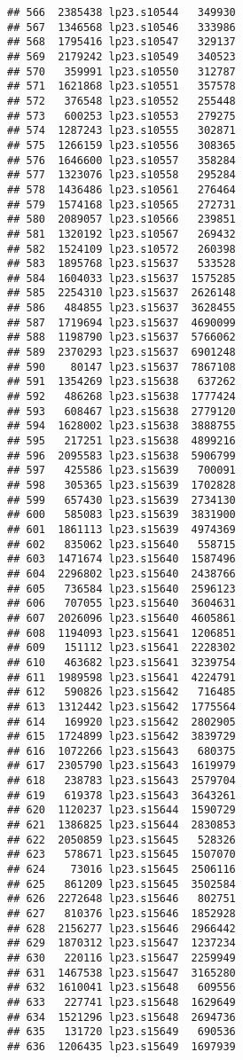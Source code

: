 \documentclass[
]{article}
\begin{document}
\begin{verbatim}
## 566  2385438 lp23.s10544   349930
## 567  1346568 lp23.s10546   333986
## 568  1795416 lp23.s10547   329137
## 569  2179242 lp23.s10549   340523
## 570   359991 lp23.s10550   312787
## 571  1621868 lp23.s10551   357578
## 572   376548 lp23.s10552   255448
## 573   600253 lp23.s10553   279275
## 574  1287243 lp23.s10555   302871
## 575  1266159 lp23.s10556   308365
## 576  1646600 lp23.s10557   358284
## 577  1323076 lp23.s10558   295284
## 578  1436486 lp23.s10561   276464
## 579  1574168 lp23.s10565   272731
## 580  2089057 lp23.s10566   239851
## 581  1320192 lp23.s10567   269432
## 582  1524109 lp23.s10572   260398
## 583  1895768 lp23.s15637   533528
## 584  1604033 lp23.s15637  1575285
## 585  2254310 lp23.s15637  2626148
## 586   484855 lp23.s15637  3628455
## 587  1719694 lp23.s15637  4690099
## 588  1198790 lp23.s15637  5766062
## 589  2370293 lp23.s15637  6901248
## 590    80147 lp23.s15637  7867108
## 591  1354269 lp23.s15638   637262
## 592   486268 lp23.s15638  1777424
## 593   608467 lp23.s15638  2779120
## 594  1628002 lp23.s15638  3888755
## 595   217251 lp23.s15638  4899216
## 596  2095583 lp23.s15638  5906799
## 597   425586 lp23.s15639   700091
## 598   305365 lp23.s15639  1702828
## 599   657430 lp23.s15639  2734130
## 600   585083 lp23.s15639  3831900
## 601  1861113 lp23.s15639  4974369
## 602   835062 lp23.s15640   558715
## 603  1471674 lp23.s15640  1587496
## 604  2296802 lp23.s15640  2438766
## 605   736584 lp23.s15640  2596123
## 606   707055 lp23.s15640  3604631
## 607  2026096 lp23.s15640  4605861
## 608  1194093 lp23.s15641  1206851
## 609   151112 lp23.s15641  2228302
## 610   463682 lp23.s15641  3239754
## 611  1989598 lp23.s15641  4224791
## 612   590826 lp23.s15642   716485
## 613  1312442 lp23.s15642  1775564
## 614   169920 lp23.s15642  2802905
## 615  1724899 lp23.s15642  3839729
## 616  1072266 lp23.s15643   680375
## 617  2305790 lp23.s15643  1619979
## 618   238783 lp23.s15643  2579704
## 619   619378 lp23.s15643  3643261
## 620  1120237 lp23.s15644  1590729
## 621  1386825 lp23.s15644  2830853
## 622  2050859 lp23.s15645   528326
## 623   578671 lp23.s15645  1507070
## 624    73016 lp23.s15645  2506116
## 625   861209 lp23.s15645  3502584
## 626  2272648 lp23.s15646   802751
## 627   810376 lp23.s15646  1852928
## 628  2156277 lp23.s15646  2966442
## 629  1870312 lp23.s15647  1237234
## 630   220116 lp23.s15647  2259949
## 631  1467538 lp23.s15647  3165280
## 632  1610041 lp23.s15648   609556
## 633   227741 lp23.s15648  1629649
## 634  1521296 lp23.s15648  2694736
## 635   131720 lp23.s15649   690536
## 636  1206435 lp23.s15649  1697939

\end{verbatim}
\end{document}
